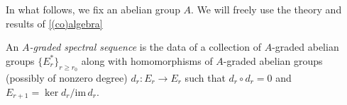 \documentclass[../main.tex]{subfiles}
\begin{document}
In what follows, we fix an abelian group $A$. We will freely use the theory and results of \autoref{(co)algebra}

\begin{definition}
    An \emph{$A$-graded spectral sequence} is the data of a collection of $A$-graded abelian groups $\{E_r^*\}_{r\ge r_0}$ along with homomorphisms of $A$-graded abelian groups (possibly of nonzero degree) $d_r:E_r\to E_r$ such that $d_r\circ d_r=0$ and $E_{r+1}=\ker d_r/\mathrm{im}\,d_r$.
\end{definition}
\end{document}
